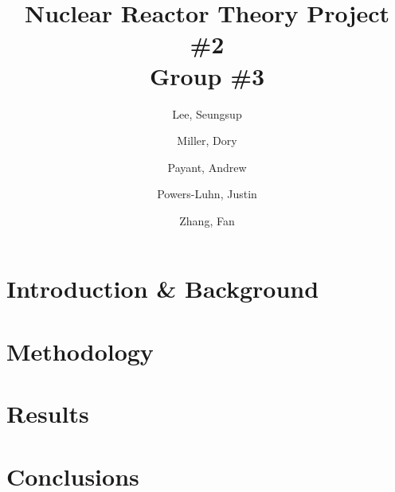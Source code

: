 \documentclass[10pt,peerreviewca]{IEEEtran}
\author{
	Lee, Seungsup
	\and
	Miller, Dory
	\and
	Payant, Andrew
	\and
	Powers-Luhn, Justin
	\and
	Zhang, Fan
}
\title{Nuclear Reactor Theory Project \#2\\Group \#3}
\date{ }
\begin{document}
\maketitle

\section{Introduction \& Background}



\section{Methodology}



\section{Results}



\section{Conclusions}


\end{document}
